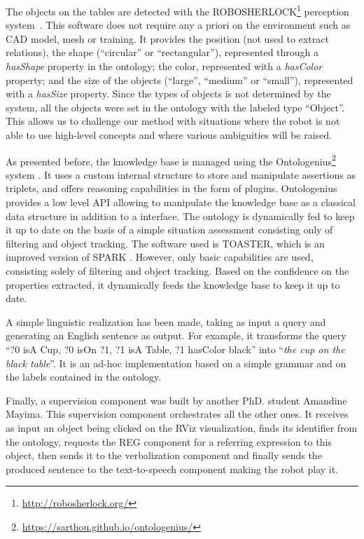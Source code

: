 \documentclass[a4paper,11pt,twoside]{StyleThese}
\begin{document}
The objects on the tables are detected with the ROBOSHERLOCK\footnote{\url{http://robosherlock.org/}} perception system~\cite{beetz2015robosherlock}. This software does not require any a priori on the environment such as CAD model, mesh or training. 
It provides the position (not used to extract relations), the shape (``circular'' or ``rectangular''), represented through a \textit{hasShape} property in the ontology; the color, represented with a \textit{hasColor} property; and the size of the objects (``large'', ``medium'' or ``small''), represented with a \textit{hasSize} property. Since the types of objects is not determined by the system, all the objects were set in the ontology with the labeled type ``Object''. This allows us to challenge our method with situations where the robot is not able to use high-level concepts and where various ambiguities will be raised.

As presented before, the knowledge base is managed using the Ontologenius\footnote{\url{https://sarthou.github.io/ontologenius/}} system \cite{sarthou2019ontologenius}. 
It uses a custom internal structure to store and manipulate assertions as triplets, and offers reasoning capabilities in the form of plugins. Ontologenius provides a low level API allowing to manipulate the knowledge base as a classical data structure in addition to a \sparql{} interface.
The ontology is dynamically fed to keep it up to date on the basis of a simple situation assessment consisting only of filtering and object tracking. The software used is TOASTER, which is an improved version of SPARK \cite{milliez2014framework}. However, only basic capabilities are used, consisting solely of filtering and object tracking. Based on the confidence on the properties extracted, it dynamically feeds the knowledge base to keep it up to date.

A simple linguistic realization has been made, taking as input a \sparql{} query and generating an English sentence as output. For example, it transforms the query ``?0 isA Cup, ?0 isOn ?1, ?1 isA Table, ?1 hasColor black'' into ``\textit{the cup on the black table}''. It is an ad-hoc implementation based on a simple grammar and on the labels contained in the ontology. 

Finally, a supervision component was built by another PhD. student Amandine Mayima. This supervision component orchestrates all the other ones. It receives as input an object being clicked on the RViz visualization, finds its identifier from the ontology, requests the REG component for a referring expression to this object, then sends it to the verbalization component and finally sends the produced sentence to the text-to-speech component making the robot play it.
\end{document}
